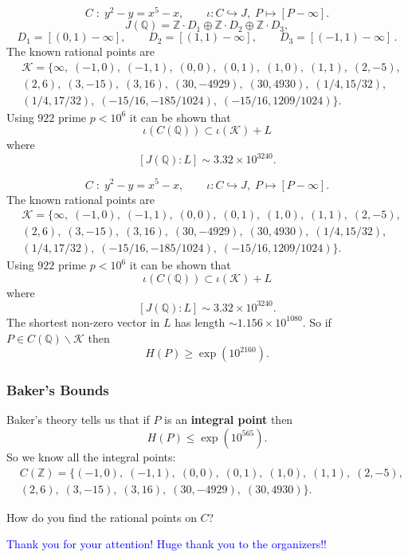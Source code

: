 \documentclass{beamer}
\newcommand{\Q}{{\mathbb Q}}
\newcommand{\Z}{{\mathbb Z}}
\newcommand{\cK}{\mathcal{K}}
\theoremstyle{definition}
\theoremstyle{remark}
\begin{document}
\begin{frame}
\begin{example}
\[
C \; : \; y^2-y=x^5-x,\qquad \iota:C \hookrightarrow J, \; P\mapsto [P-\infty].
\]
\[
J(\Q)=\Z \cdot D_1\oplus \Z \cdot D_2 \oplus \Z \cdot D_3,
\]
\[
D_1=[(0,1) -\infty], \qquad D_2=[(1,1)-\infty],
\qquad D_3=[(-1,1)-\infty]\, .
\]
The known rational points are
\begin{align*}
&\cK = \{\infty, \; (-1,0),\; (-1,1), \; (0,0),\; (0,1),\; (1,0),\; (1,1),\;(2,-5),\\
     & (2,6),\; (3,-15),\; (3,16),\; (30,-4929),\; (30,4930), \;
 (1/4, 15/32),\\
&  (1/4, 17/32),\;
 (-15/16, -185/1024),\;
(-15/16, 1209/1024) \}.
\end{align*}
Using $922$ prime $p <10^6$ it can be shown that
\[
\iota(C(\Q)) \subset \iota(\cK) +L
\]
where
\[
[J(\Q):L] \sim 3.32 \times 10^{3240}.
\]
\end{example}
\end{frame}
\begin{frame}
\begin{example}
\[
C \; : \; y^2-y=x^5-x,\qquad \iota:C \hookrightarrow J, \; P\mapsto [P-\infty].
\]
The known rational points are
\begin{align*}
&\cK = \{\infty, \; (-1,0),\; (-1,1), \; (0,0),\; (0,1),\; (1,0),\; (1,1),\;(2,-5),\\
     & (2,6),\; (3,-15),\; (3,16),\; (30,-4929),\; (30,4930), \;
 (1/4, 15/32),\\
&  (1/4, 17/32),\;
 (-15/16, -185/1024),\;
(-15/16, 1209/1024) \}.
\end{align*}
Using $922$ prime $p <10^6$ it can be shown that
\[
\iota(C(\Q)) \subset \iota(\cK) +L
\]
where
\[
[J(\Q):L] \sim 3.32 \times 10^{3240}.
\]
The shortest non-zero vector in $L$ has length $\sim 1.156 \times 10^{1080}$.
So if $P \in C(\Q) \backslash \cK$ then
\[
H(P) \ge \exp(10^{2160}).
\]
\end{example}
\end{frame}
\begin{frame}
\frametitle{Baker's Bounds}
Baker's theory tells us that if $P$ is an \textbf{integral point} then
\[
H(P) \le \exp(10^{565}).
\]
So we know all the integral points:
\begin{align*}
&C(\Z) = \{(-1,0),\; (-1,1), \; (0,0),\; (0,1),\; (1,0),\; (1,1),\;(2,-5),\\
     & (2,6),\; (3,-15),\; (3,16),\; (30,-4929),\; (30,4930) \}.
\end{align*}

How do you find the rational points on $C$?

\pause

\bigskip

\begin{center}
\Large{\textcolor{blue}{Thank you for your attention!}} \newline
\Huge{\textcolor{blue}{Huge thank you to the organizers!!}}
\end{center}

\end{frame}
\end{document}
